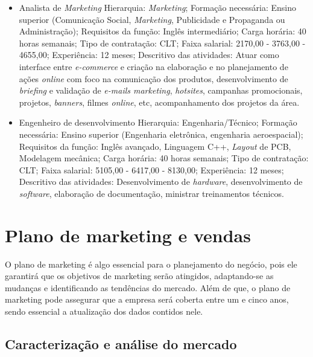 \documentclass[
	12pt,				%
	openright,			%
	oneside,			%
	a4paper,			%
	english,			%
	french,				%
	spanish,			%
	brazil				%
	]{abntex2}
\begin{document}
\begin{itemize}
		\item Analista de \textit{Marketing}
		\subitem Hierarquia: \textit{Marketing};
		\subitem Formação necessária: Ensino superior (Comunicação Social, \textit{Marketing}, Publicidade e Propaganda ou Administração);
		\subitem Requisitos da função: Inglês intermediário;
		\subitem Carga horária: 40 horas semanais;
		\subitem Tipo de contratação: CLT;
		\subitem Faixa salarial: 2170,00 - 3763,00 - 4655,00;
		\subitem Experiência: 12 meses;
		\subitem Descritivo das atividades: Atuar como interface entre \textit{e-commerce} e criação na elaboração e no planejamento de ações \textit{online} com foco na comunicação dos produtos, desenvolvimento de \textit{briefing} e validação de \textit{e-mails marketing}, \textit{hotsites}, campanhas promocionais, projetos, \textit{banners}, filmes \textit{online}, etc, acompanhamento dos projetos da área.
		
		\item Engenheiro de desenvolvimento
		\subitem Hierarquia: Engenharia/Técnico;
		\subitem Formação necessária: Ensino superior (Engenharia eletrônica, engenharia aeroespacial);
		\subitem Requisitos da função: Inglês avançado, Linguagem C++, \textit{Layout} de PCB, Modelagem mecânica;
		\subitem Carga horária: 40 horas semanais;
		\subitem Tipo de contratação: CLT;
		\subitem Faixa salarial: 5105,00 - 6417,00 - 8130,00;
		\subitem Experiência: 12 meses;
		\subitem Descritivo das atividades: Desenvolvimento de \textit{hardware}, desenvolvimento de \textit{software}, elaboração de documentação, ministrar treinamentos técnicos.
		
	\end{itemize}
			
\chapter[Plano de marketing e vendas]{Plano de marketing e vendas}

	O plano de marketing é algo essencial para o planejamento do negócio, pois ele garantirá que os objetivos de marketing serão atingidos, adaptando-se as mudanças e identificando as tendências do mercado. Além de que, o plano de marketing pode assegurar que a empresa será coberta entre um e cinco anos, sendo essencial a atualização dos dados contidos nele. 

\section[Caracterização e análise do mercado]{Caracterização e análise do mercado}
\end{document}
